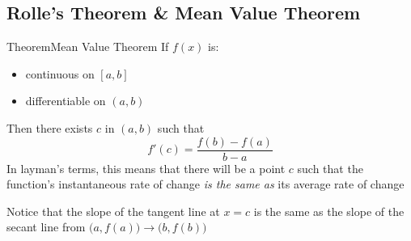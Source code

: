 \documentclass{MathNotes}
\newenvironment{theorem}[1]{\begin{GrayBox}{Theorem}{#1}}{\end{GrayBox}}
\begin{document}
\subsection{Rolle's Theorem \& Mean Value Theorem}
\begin{multicols}{2}
	\begin{theorem}{Mean Value Theorem}
		If $f(x)$ is:
		\begin{itemize}
			\item continuous on $[a, b]$
			\item differentiable on $(a, b)$
		\end{itemize}
		Then there exists $c$ in $(a, b)$ such that
		$$f'(c)=\frac{f(b)-f(a)}{b - a}$$ In layman's terms, this
		means that there will be a point $c$ such that the function's instantaneous
		rate of change \textit{ is the same as} its average rate of change
	\end{theorem}

	\begin{center}
	\end{center}

	Notice that the slope of the tangent line at $x=c$ is the same as the slope
	of the secant line from $\big(a, f(a)\big)\to\big(b,f(b)\big)$
\end{multicols}
\end{document}
